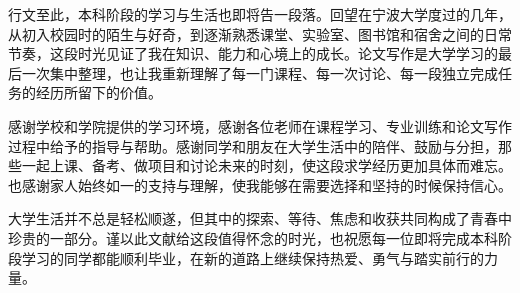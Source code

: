 行文至此，本科阶段的学习与生活也即将告一段落。回望在宁波大学度过的几年，从初入校园时的陌生与好奇，到逐渐熟悉课堂、实验室、图书馆和宿舍之间的日常节奏，这段时光见证了我在知识、能力和心境上的成长。论文写作是大学学习的最后一次集中整理，也让我重新理解了每一门课程、每一次讨论、每一段独立完成任务的经历所留下的价值。

感谢学校和学院提供的学习环境，感谢各位老师在课程学习、专业训练和论文写作过程中给予的指导与帮助。感谢同学和朋友在大学生活中的陪伴、鼓励与分担，那些一起上课、备考、做项目和讨论未来的时刻，使这段求学经历更加具体而难忘。也感谢家人始终如一的支持与理解，使我能够在需要选择和坚持的时候保持信心。

大学生活并不总是轻松顺遂，但其中的探索、等待、焦虑和收获共同构成了青春中珍贵的一部分。谨以此文献给这段值得怀念的时光，也祝愿每一位即将完成本科阶段学习的同学都能顺利毕业，在新的道路上继续保持热爱、勇气与踏实前行的力量。

